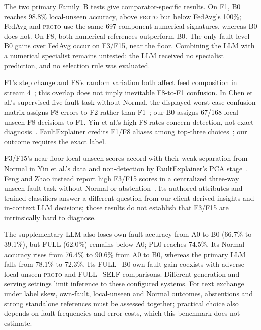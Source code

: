 \documentclass[conference]{IEEEtran}
\newcommand{\PROTO}{\textsc{proto}}
\newcommand{\cond}[1]{\textsf{#1}}
\begin{document}
The two primary Family~B tests give comparator-specific results. On F1, \cond{B0} reaches 98.8\% local-unseen accuracy, above \PROTO{} but below FedAvg's 100\%; FedAvg and \PROTO{} use the same 697-component numerical signatures, whereas \cond{B0} does not. On F8, both numerical references outperform \cond{B0}. The only fault-level \cond{B0} gains over FedAvg occur on F3/F15, near the floor. Combining the LLM with a numerical specialist remains untested: the LLM received no specialist prediction, and no selection rule was evaluated.

F1's step change and F8's random variation both affect feed composition in stream 4~\cite{downs1993tep}; this overlap does not imply inevitable F8-to-F1 confusion. In Chen et al.'s supervised five-fault task without Normal, the displayed worst-case confusion matrix assigns F8 errors to F2 rather than F1~\cite{chen2022cnnlstm}; our \cond{B0} assigns 67/168 local-unseen F8 decisions to F1. Yin et al.'s high F8 rates concern detection, not exact diagnosis~\cite{chiang2001fdd,yin2012comparison}. FaultExplainer credits F1/F8 aliases among top-three choices~\cite{khan2025faultexplainer}; our outcome requires the exact label.

F3/F15's near-floor local-unseen scores accord with their weak separation from Normal in Yin et al.'s data and non-detection by FaultExplainer's PCA stage~\cite{yin2012comparison,khan2025faultexplainer}. Feng and Zhao instead report high F3/F15 scores in a centralized three-way unseen-fault task without Normal or abstention~\cite{feng2021attributes}. Its authored attributes and trained classifiers answer a different question from our client-derived insights and in-context LLM decisions; those results do not establish that F3/F15 are intrinsically hard to diagnose.

The supplementary LLM also loses own-fault accuracy from \cond{A0} to \cond{B0} (66.7\% to 39.1\%), but \cond{FULL} (62.0\%) remains below \cond{A0}; \cond{PL0} reaches 74.5\%. Its Normal accuracy rises from 76.4\% to 90.6\% from \cond{A0} to \cond{B0}, whereas the primary LLM falls from 78.1\% to 72.3\%. Its \cond{FULL}$-$\cond{B0} own-fault gain coexists with adverse local-unseen \PROTO{} and \cond{FULL}$-$\cond{SELF} comparisons. Different generation and serving settings limit inference to these configured systems. For text exchange under label skew, own-fault, local-unseen and Normal outcomes, abstentions and strong standalone references must be assessed together; practical choice also depends on fault frequencies and error costs, which this benchmark does not estimate.
\end{document}
